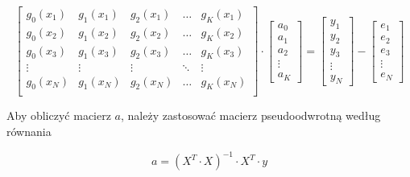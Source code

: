 \begin{equation*}
    \begin{bmatrix}
            g_0(x_1) & g_1(x_1) & g_2(x_1) & \hdots & g_K(x_1) \\
            g_0(x_2) & g_1(x_2) & g_2(x_2) & \hdots & g_K(x_2) \\
            g_0(x_3) & g_1(x_3) & g_2(x_3) & \hdots & g_K(x_3) \\
            \vdots & \vdots & \vdots & \ddots & \vdots \\ 
            g_0(x_N) & g_1(x_N) & g_2(x_N) & \hdots & g_K(x_N) \\
    \end{bmatrix}
\cdot \begin{bmatrix}
    a_0 \\ a_1 \\ a_2 \\ \vdots \\ a_K
\end{bmatrix}
 = \begin{bmatrix}
    y_1 \\ y_2 \\ y_3 \\ \vdots \\ y_N
\end{bmatrix} - \begin{bmatrix}
    e_1\\e_2\\e_3\\\vdots\\e_N
\end{bmatrix}
\end{equation*}

Aby obliczyć macierz $a$, należy zastosować macierz pseudoodwrotną
według równania

\begin{equation*}
a = ( X^T \cdot X)^{-1} \cdot X^T \cdot y
\end{equation*}